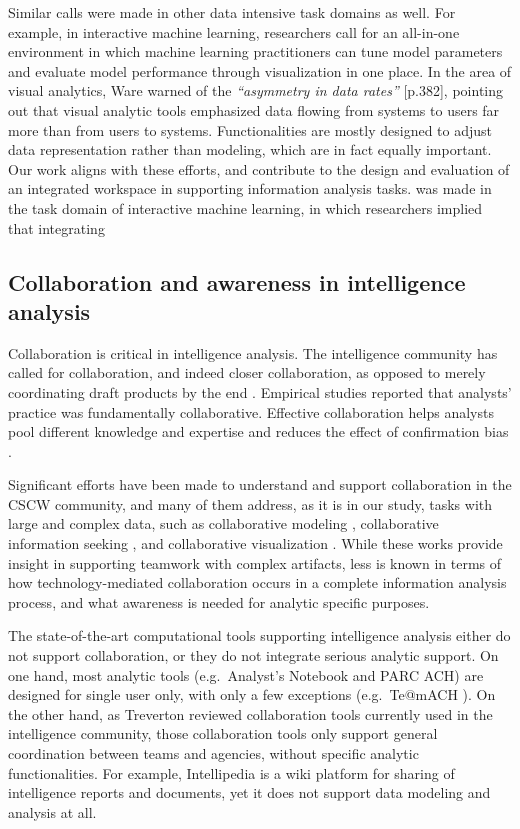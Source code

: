 Similar calls were made in other data intensive task domains as well. For example, in interactive machine learning, researchers \cite{Chen2016, Amershi2015} call for an all-in-one environment in which machine learning practitioners can tune model parameters and evaluate model performance through visualization in one place. In the area of visual analytics, Ware \cite{Ware2012} warned of the \emph{``asymmetry in
data rates''} [p.382], pointing out that visual analytic tools emphasized data
flowing from systems to users far more than from users to systems. Functionalities are mostly designed to adjust data representation
rather than modeling, which are in fact equally important.
Our work aligns with these efforts, and contribute to the design and evaluation of an integrated workspace in supporting information analysis tasks. was made in the task domain of interactive machine learning, in which researchers implied that integrating

\subsection{Collaboration and awareness in intelligence analysis}

Collaboration is critical in intelligence analysis. The intelligence community has called for collaboration, and indeed closer collaboration, as opposed to merely coordinating draft products by the end \cite{Vision2015}. Empirical studies \cite{Chin2009,Kang2011} reported that analysts' practice was fundamentally collaborative. Effective collaboration helps analysts pool different knowledge and expertise and reduces the effect of confirmation bias \cite{Heuer1999}.

Significant efforts have been made to understand and support collaboration in the CSCW community, and many of them address, as it is in our study, tasks with large and complex data, such as collaborative modeling \cite{Kolfschoten2008, Prilla2013}, collaborative information seeking \cite{Golovchinsky2009a, Kelly2014a}, and collaborative visualization \cite{Isenberg2011,Heer2008e}. While these works provide insight in supporting teamwork with complex artifacts, less is known in terms of how technology-mediated collaboration occurs in a complete information analysis process, and what awareness is needed for analytic specific purposes.

The state-of-the-art computational tools supporting intelligence analysis either
do not support collaboration, or they do not integrate serious analytic
support. On one hand, most analytic tools (e.g.~Analyst's Notebook and PARC ACH)
are designed for single user only, with only a few exceptions (e.g.~Te@mACH
\cite{Globalytica2017}). On the other hand, as Treverton \cite{Treverton2016}
reviewed collaboration tools currently used in the intelligence community, those
collaboration tools only support general coordination between teams and
agencies, without specific analytic functionalities. For example, Intellipedia
\cite{Intelink2017} is a wiki platform for sharing of intelligence reports and
documents, yet it does not support data modeling and analysis at all.

